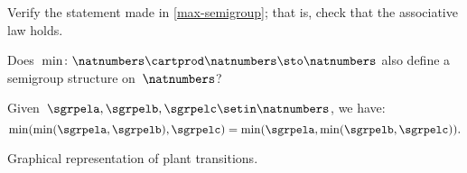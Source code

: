 \begin{exercise}
    \label{ex:max-semigroup}
    Verify the statement made in \cref{max-semigroup}; that is, check that the associative law holds.

    Does~$\min \colon \natnumbers \cartprod \natnumbers \sto \natnumbers$ also define a semigroup structure on~$\natnumbers$?
\end{exercise}
\begin{solution}
    Given~$\sgrpela,\sgrpelb,\sgrpelc\setin \natnumbers$, we have:
    \begin{equation}
        \label{eq:min-assoc}
        \min(\min(\sgrpela,\sgrpelb),\sgrpelc)=\min(\sgrpela,\min(\sgrpelb,\sgrpelc)).
    \end{equation}
\end{solution}

\begin{marginfigure}
    \centering
    \caption{Graphical representation of plant transitions.}
    \label{fig:plants_transitions}
\end{marginfigure}

